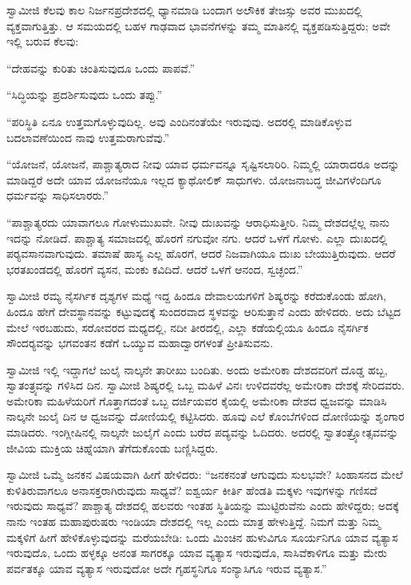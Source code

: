  ಸ್ವಾಮೀಜಿ ಕೆಲವು ಕಾಲ ನಿರ್ಜನಪ್ರದೇಶದಲ್ಲಿ ಧ್ಯಾನಮಾಡಿ ಬಂದಾಗ ಅಲೌಕಿಕ ತೇಜಸ್ಸು ಅವರ ಮುಖದಲ್ಲಿ ವ್ಯಕ್ತವಾಗುತ್ತಿತ್ತು. ಆ ಸಮಯದಲ್ಲಿ ಬಹಳ ಗಾಢವಾದ ಭಾವನೆಗಳನ್ನು ತಮ್ಮ ಮಾತಿನಲ್ಲಿ ವ್ಯಕ್ತಪಡಿಸುತ್ತಿದ್ದರು; ಅವೇ ಇಲ್ಲಿ ಬರುವ ಕೆಲವು: 

 “ದೇಹವನ್ನು ಕುರಿತು ಚಿಂತಿಸುವುದೂ ಒಂದು ಪಾಪವೆ.” 

 “ಸಿದ್ಧಿಯನ್ನು ಪ್ರದರ್ಶಿಸುವುದು ಒಂದು ತಪ್ಪು.” 

 “ಪರಿಸ್ಥಿತಿ ಏನೂ ಉತ್ತಮಗೊಳ್ಳುವುದಿಲ್ಲ. ಅವು ಎಂದಿನಂತೆಯೇ ಇರುವುವು. ಅದರಲ್ಲಿ ಮಾಡಿಕೊಳ್ಳುವ ಬದಲಾವಣೆಯಿಂದ ನಾವು ಉತ್ತಮರಾಗುವೆವು.” 

 “ಯೋಜನೆ, ಯೋಜನೆ, ಪಾಶ್ಚಾತ್ಯರಾದ ನೀವು ಯಾವ ಧರ್ಮವನ್ನೂ ಸೃಷ್ಟಿಸಲಾರಿರಿ. ನಿಮ್ಮಲ್ಲಿ ಯಾರಾದರೂ ಅದನ್ನು ಮಾಡಿದ್ದರೆ ಅದೇ ಯಾವ ಯೋಜನೆಯೂ ಇಲ್ಲದ ಕ್ಯಾಥೋಲಿಕ್ ಸಾಧುಗಳು. ಯೋಜನಾಬದ್ಧ ಜೀವಿಗಳೆಂದಿಗೂ ಧರ್ಮವನ್ನು ಸಾಧಿಸಲಾರರು.” 

 “ಪಾಶ್ಚಾತ್ಯರದು ಯಾವಾಗಲೂ ಗೋಳುಮುಖವೇ. ನೀವು ದುಃಖವನ್ನು ಆರಾಧಿಸುತ್ತೀರಿ. ನಿಮ್ಮ ದೇಶದಲ್ಲೆಲ್ಲ ನಾನು ಇದನ್ನು ನೋಡಿದೆ. ಪಾಶ್ಚಾತ್ಯ ಸಮಾಜದಲ್ಲಿ ಹೊರಗೆ ನಗುವೋ ನಗು. ಆದರೆ ಒಳಗೆ ಗೋಳು. ಎಲ್ಲಾ ದುಃಖದಲ್ಲಿ ಪರ‍್ಯವಸಾನವಾಗುವುದು. ತಮಾಷೆ ಹಾಸ್ಯ ಎಲ್ಲ ಹೊರಗೆ, ಆದರೆ ನಿಜವಾಗಿಯೂ ದುಃಖ ಬೇಯುತ್ತಿರುವುದು. ಆದರೆ ಭರತಖಂಡದಲ್ಲಿ ಹೊರಗೆ ವ್ಯಸನ, ಮಂಕು ಕವಿದಿದೆ. ಆದರೆ ಒಳಗೆ ಆನಂದ, ಸ್ವಚ್ಛಂದ.” 

 ಸ್ವಾಮೀಜಿ ರಮ್ಯ ನೈಸರ್ಗಿಕ ದೃಶ್ಯಗಳ ಮಧ್ಯೆ ಇದ್ದ ಹಿಂದೂ ದೇವಾಲಯಗಳಿಗೆ ಶಿಷ್ಯರನ್ನು ಕರೆದುಕೊಂಡು ಹೋಗಿ, ಹಿಂದೂ ಹೇಗೆ ದೇವಸ್ಥಾನವನ್ನು ಕಟ್ಟುವುದಕ್ಕೆ ಸುಂದರವಾದ ಸ್ಥಳವನ್ನು ಆರಿಸುತ್ತಾನೆ ಎಂದು ಹೇಳಿದರು. ಅದು ಬೆಟ್ಟದ ಮೇಲೆ ಇರಬಹುದು, ಸರೋವರದ ಮಧ್ಯದಲ್ಲಿ, ನದೀ ತೀರದಲ್ಲಿ, ಎಲ್ಲಾ ಕಡೆಯಲ್ಲಿಯೂ ಹಿಂದೂ ನೈಸರ್ಗಿಕ ಸೌಂದರ‍್ಯವನ್ನು ಭಗವಂತನ ಕಡೆಗೆ ಒಯ್ಯುವ ಮಹಾದ್ವಾರಗಳಂತೆ ಪ್ರೀತಿಸುವನು. 

 ಸ್ವಾಮೀಜಿ ಇಲ್ಲಿ ಇದ್ದಾಗಲೆ ಜುಲೈ ನಾಲ್ಕನೇ ತಾರೀಖು ಬಂದಿತು. ಅಂದು ಅಮೇರಿಕಾ ದೇಶದವರಿಗೆ ದೊಡ್ಡ ಹಬ್ಬ, ಸ್ವಾತಂತ್ರ್ಯವನ್ನು ಗಳಿಸಿದ ದಿನ. ಸ್ವಾಮೀಜಿ ಶಿಷ್ಯರಲ್ಲಿ ಒಬ್ಬ ಮಹಿಳೆ ವಿನಃ ಉಳಿದವರೆಲ್ಲ ಅಮೇರಿಕಾ ದೇಶಕ್ಕೆ ಸೇರಿದವರು. ಅಮೇರಿಕಾ ಮಹಿಳೆಯರಿಗೆ ಗೊತ್ತಾಗದಂತೆ ಒಬ್ಬ ದರ್ಜಿಯವರ ಕೈಯಲ್ಲಿ ಅಮೇರಿಕಾ ದೇಶದ ಧ್ವಜವನ್ನು ಮಾಡಿಸಿ ನಾಲ್ಕನೇ ಜುಲೈ ದಿನ ಆ ಧ್ವಜವನ್ನು ದೋಣಿಯಲ್ಲಿ ಕಟ್ಟಿಸಿದರು. ಹೂವು ಎಲೆ ಕೊಂಬೆಗಳಿಂದ ದೋಣಿಯನ್ನು ಶೃಂಗಾರ ಮಾಡಿದರು. ಇಂಗ್ಲೀಷಿನಲ್ಲಿ ನಾಲ್ಕನೇ ಜುಲೈಗೆ ಎಂದು ಬರೆದ ಪದ್ಯವನ್ನು ಓದಿದರು. ಅದರಲ್ಲಿ ಸ್ವಾತಂತ್ರ್ಯೋತ್ಸವವನ್ನು ಜೀವಿಯ ಮುಕ್ತಿಯ ಚಿಹ್ನೆಯಾಗಿ ತೆಗೆದುಕೊಂಡು ಬಣ್ಣಿಸಿದ್ದರು. 

 ಸ್ವಾಮೀಜಿ ಒಮ್ಮೆ ಜನಕನ ವಿಷಯವಾಗಿ ಹೀಗೆ ಹೇಳಿದರು: “ಜನಕನಂತೆ ಆಗುವುದು ಸುಲಭವೇ? ಸಿಂಹಾಸನದ ಮೇಲೆ ಕುಳಿತಿರುವಾಗಲೂ ಅನಾಸಕ್ತರಾಗಿರುವುದು ಸಾಧ್ಯವೆ? ಐಶ್ವರ್ಯ ಕೀರ್ತಿ ಹೆಂಡತಿ ಮಕ್ಕಳು ಇವುಗಳನ್ನು ಗಣಿಸದೆ ಇರುವುದು ಸಾಧ್ಯವೆ? ಪಾಶ್ಚಾತ್ಯ ದೇಶದಲ್ಲಿ ಹಲವರು ಇಂತಹ ಸ್ಥಿತಿಯನ್ನು ಮುಟ್ಟಿರುವೆನು ಎಂದು ಹೇಳಿದ್ದರು; ಅದಕ್ಕೆ ನಾನು ಇಂತಹ ಮಹಾಪುರುಷರು ಇಂಡಿಯಾ ದೇಶದಲ್ಲಿ ಇಲ್ಲ ಎಂದು ಮಾತ್ರ ಹೇಳುತ್ತಿದ್ದೆ. ನಿಮಗೆ ಮತ್ತು ನಿಮ್ಮ ಮಕ್ಕಳಿಗೆ ಹೀಗೆ ಹೇಳಿಕೊಳ್ಳುವುದನ್ನು ಮರೆಯಬೇಡಿ: ಒಂದು ಮಿಂಚಿನ ಹುಳುವಿಗೂ ಸೂರ್ಯನಿಗೂ ಯಾವ ವ್ಯತ್ಯಾಸ ಇರುವುದೊ, ಒಂದು ಹಳ್ಳಕ್ಕೂ ಅನಂತ ಸಾಗರಕ್ಕೂ ಯಾವ ವ್ಯತ್ಯಾಸ ಇರುವುದೊ, ಸಾಸಿವೆಕಾಳಿಗೂ ಮತ್ತು ಮೇರು ಪರ್ವತಕ್ಕೂ ಯಾವ ವ್ಯತ್ಯಾಸ ಇರುವುದೋ ಅದೇ ಗೃಹಸ್ಥನಿಗೂ ಸಂನ್ಯಾಸಿಗೂ ಇರುವ ವ್ಯತ್ಯಾಸ.”‌ 

